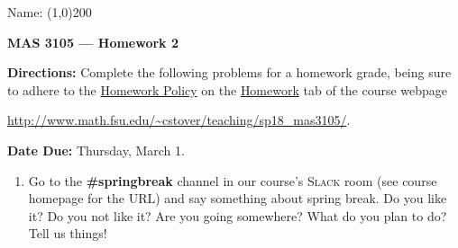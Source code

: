 \documentclass[12 pt]{article}
\begin{document}
\begin{flushright}Name: \line(1,0){200}\end{flushright}
\begin{center}
\Large{\textbf{MAS 3105 --- Homework 2}}
\end{center}
\textbf{Directions:} Complete the following problems for a homework grade, being sure to adhere to the \ul{Homework Policy} on the \ul{Homework} tab of the course webpage
\begin{center}
	 \url{http://www.math.fsu.edu/~cstover/teaching/sp18_mas3105/}.
\end{center}
\textbf{Date Due:} Thursday, March 1.
\vspace{0.125in}
\begin{enumerate}[leftmargin=0in, rightmargin=-0.25in]
	\item Go to the \textbf{\#springbreak} channel in our course's \textsc{Slack} room (see course homepage for the URL) and say something about spring break. Do you like it? Do you not like it? Are you going somewhere? What do you plan to do? Tell us things! \hspace{6mm}
	
	\vspace{-0.375in}
	

\end{enumerate}
\end{document}
